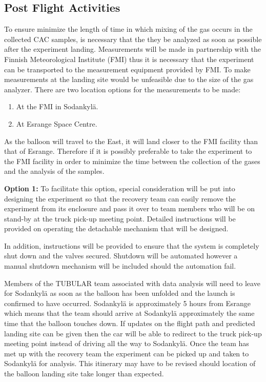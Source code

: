 \subsection{Post Flight Activities}

To ensure minimize the length of time in which mixing of the gas occurs in the collected CAC samples, is necessary that the they  be analyzed as soon as possible after the experiment landing. Measurements will be made in partnership with the Finnish Meteorological Institute (FMI) thus it is necessary that the experiment can be transported to the measurement equipment provided by FMI. To make measurements at the landing site would be unfeasible due to the size of the gas analyzer. There are two location options for the measurements to be made:

\begin{enumerate}
    \item At the FMI in Sodankylä.
    \item At Esrange Space Centre.
\end{enumerate}

As the balloon will travel to the East, it will land closer to the FMI facility than that of Esrange. Therefore if it is possibly preferable to take the experiment to the FMI facility in order to minimize the time between the collection of the gases and the analysis of the samples. 

\textbf{Option 1:}
To facilitate this option, special consideration will be put into designing the experiment so that the recovery team can easily remove the experiment from its enclosure and pass it over to team members who will be on stand-by at the truck pick-up meeting point. Detailed instructions will be provided on operating the detachable mechanism that will be designed. 

In addition, instructions will be provided to ensure that the system is completely shut down and the valves secured. Shutdown will be automated however a manual shutdown mechanism will be included should the automation fail.

Members of the TUBULAR team associated with data analysis will need to leave for Sodankylä as soon as the balloon has been unfolded and the launch is confirmed to have occurred. Sodankylä is approximately 5 hours from Esrange which means that the team should arrive at Sodankylä approximately the same time that the balloon touches down. If updates on the flight path and predicted landing site can be given then the car will be able to redirect to the truck pick-up meeting point instead of driving all the way to Sodankylä. Once the team has met up with the recovery team the experiment can be picked up and taken to Sodankylä for analysis. This itinerary may have to be revised should location of the balloon landing site take longer than expected.


